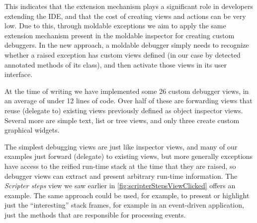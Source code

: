 \documentclass[sigplan,screen]{acmart} %
\newcommand\on[1]{\nbc{ON}{#1}{olive}} %
\begin{document}

This indicates that the extension mechanism plays a significant role in developers extending the IDE, and that the cost of creating views and actions can be very low.
Due to this, through moldable exceptions we aim to apply the same extension mechanism present in the moldable inspector for creating custom debuggers.
In the new approach, a moldable debugger simply needs to recognize whether a raised exception has custom views defined (in our case by detected annotated methods of its class), and then activate those views in its user interface.


At the time of writing we have implemented some 26 custom debugger views, in an average of under 12 lines of code.
Over half of these are forwarding views that reuse (delegate to) existing views previously defined as object inspector views.
Several more are simple text, list or tree views, and only three create custom graphical widgets.

The simplest debugging views are just like inspector views, and many of our examples just forward (delegate) to existing views, but more generally exceptions have access to the reified run-time stack at the time that they are raised, so debugger views can extract and present arbitrary run-time information.
The \emph{Scripter steps} view we saw earlier in \autoref{fig:scripterStepsViewClicked} offers an example.
The same approach could be used, for example, to present or highlight just the ``interesting'' stack frames, for example in an event-driven application, just the methods that are responsible for processing events.
\end{document}
